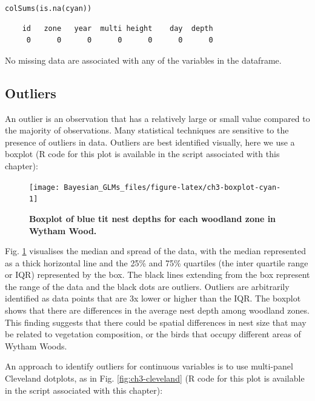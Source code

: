 \documentclass[
]{book}
\begin{document}
\texttt{colSums(is.na(cyan))}

\begin{verbatim}
    id   zone   year  multi height    day  depth 
     0      0      0      0      0      0      0 
\end{verbatim}

No missing data are associated with any of the variables in the dataframe.

\hypertarget{outliers}{%
\subsection{Outliers}\label{outliers}}

An outlier is an observation that has a relatively large or small value compared to the majority of observations. Many statistical techniques are sensitive to the presence of outliers in data. Outliers are best identified visually, here we use a boxplot (R code for this plot is available in the script associated with this chapter):



\begin{figure}

{\centering \texttt{[image: Bayesian\_GLMs\_files/figure-latex/ch3-boxplot-cyan-1]} 

}

\caption{\textbf{Boxplot of blue tit nest depths for each woodland zone in Wytham Wood.}}\label{fig:ch3-boxplot-cyan}
\end{figure}

Fig. \ref{fig:ch3-boxplot-cyan} visualises the median and spread of the data, with the median represented as a thick horizontal line and the 25\% and 75\% quartiles (the inter quartile range or IQR) represented by the box. The black lines extending from the box represent the range of the data and the black dots are outliers. Outliers are arbitrarily identified as data points that are 3x lower or higher than the IQR. The boxplot shows that there are differences in the average nest depth among woodland zones. This finding suggests that there could be spatial differences in nest size that may be related to vegetation composition, or the birds that occupy different areas of Wytham Woods.

An approach to identify outliers for continuous variables is to use multi-panel Cleveland dotplots, as in Fig. \ref{fig:ch3-cleveland} (R code for this plot is available in the script associated with this chapter):
\end{document}
